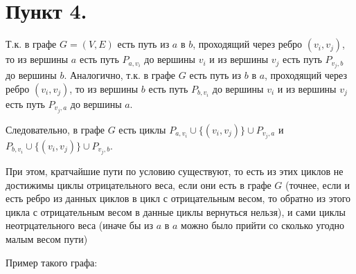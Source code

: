 \documentclass{report}
\begin{document}





\par

\pagebreak

\section*{Пункт 4.}

\raggedright

Т.к. в графе $G = (V, E)$ есть путь  из $a$ в $b$, проходящий через ребро $(v_i, v_j)$, то из вершины
$a$ есть путь $P_{a, v_i}$ до вершины $v_i$ и из вершины $v_j$ есть путь $P_{v_j, b}$ до вершины $b$.
Аналогично, т.к. в графе $G$ есть путь из $b$ в $a$, проходящий через ребро $(v_i, v_j)$, то из вершины 
$b$ есть путь $P_{b, v_i}$ до вершины $v_i$ и из вершины $v_j$ есть путь $P_{v_j, a}$ до вершины $a$.

Следовательно, в графе $G$ есть циклы $P_{a, v_i} \cup \{ (v_i, v_j) \} \cup P_{v_j, a}$ и $P_{b, v_i} \cup \{ (v_i, v_j) \} \cup P_{v_j, b}$.

При этом, кратчайшие пути по условию существуют, то есть из этих циклов не достижимы циклы отрицательного веса, если они есть в графе $G$
(точнее, если и есть ребро из данных циклов в цикл с отрицательным весом, то обратно из этого цикла с отрицательным весом в данные циклы вернуться нельзя),
и сами циклы неотрцательного веса (иначе бы из $a$ в $a$ можно было прийти со сколько угодно малым весом пути)

Пример такого графа:
\end{document}
